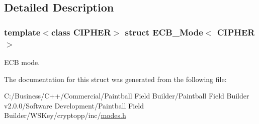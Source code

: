 \subsection{Detailed Description}
\subsubsection*{template$<$class CIPHER$>$ struct ECB\_\-Mode$<$ CIPHER $>$}

ECB mode. 

The documentation for this struct was generated from the following file:\begin{DoxyCompactItemize}
\item 
C:/Business/C++/Commercial/Paintball Field Builder/Paintball Field Builder v2.0.0/Software Development/Paintball Field Builder/WSKey/cryptopp/inc/\hyperlink{modes_8h}{modes.h}\end{DoxyCompactItemize}
